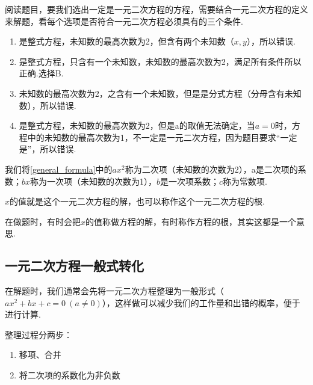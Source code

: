 \documentclass[lang=cn, 10pt, titlestyle=hang]{elegantbook}
\begin{document}
\begin{solution}
    阅读题目，要我们选出一定是一元二次方程的方程，需要结合一元二次方程的定义来解题，看每个选项是否符合一元二次方程必须具有的三个条件.
    \begin{enumerate}[label=\Alph*.]
        \item 是整式方程，未知数的最高次数为2，但含有两个未知数（\(x,y\)），所以错误.
        \item 是整式方程，只含有一个未知数，未知数的最高次数为2，满足所有条件所以正确.选择B.
        \item 未知数的最高次数为2，之含有一个未知数，但是是分式方程（分母含有未知数），所以错误.
        \item 是整式方程，未知数的最高次数为2，但是a的取值无法确定，当\(a=0\)时，方程中的未知数的最高次数为1，不一定是一元二次方程，因为题目要求“一定是”，所以错误.
    \end{enumerate}
\end{solution}


\begin{definition}
    我们将\eqref{general_formula}中的$ax^2$称为二次项（未知数的次数为2），a是二次项的系数；$bx$称为一次项（未知数的次数为1），$b$是一次项系数；$c$称为常数项.
\end{definition}
\begin{definition}
    $x$的值就是这个一元二次方程的解，也可以称作这个一元二次方程的根.\\
    \begin{remark}
        在做题时，有时会把$x$的值称做方程的解，有时称作方程的根，其实这都是一个意思.
    \end{remark}
\end{definition}





\subsection{一元二次方程一般式转化}

在解题时，我们通常会先将一元二次方程整理为一般形式（$
ax^2 + bx + c = 0 \ (a \neq 0)
$），这样做可以减少我们的工作量和出错的概率，便于进行计算.



整理过程分两步：
\begin{enumerate}
    \item 移项、合并
    \item 将二次项的系数化为非负数
\end{enumerate}
\end{document}
